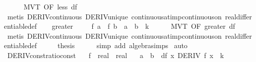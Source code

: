 \begin{isabellebody}
\ \ \ \ \isamarkupfalse%
\ MVT\ {\isacharbrackleft}{\kern0pt}OF\ less{\isacharbrackright}{\kern0pt}\ df\isanewline
\ \ \ \ \isamarkupfalse%
\ {\isacharparenleft}{\kern0pt}metis\ DERIV{\isacharunderscore}{\kern0pt}continuous\ DERIV{\isacharunderscore}{\kern0pt}unique\ continuous{\isacharunderscore}{\kern0pt}at{\isacharunderscore}{\kern0pt}imp{\isacharunderscore}{\kern0pt}continuous{\isacharunderscore}{\kern0pt}on\ real{\isacharunderscore}{\kern0pt}differentiable{\isacharunderscore}{\kern0pt}def{\isacharparenright}{\kern0pt}\isanewline
{}\isamarkupfalse%
\isanewline
\ \ \isamarkupfalse%
\ greater\isanewline
\ \ \isamarkupfalse%
\ \ {\isachardoublequoteopen}f\ a\ {\isacharminus}{\kern0pt}\ f\ b\ {\isacharequal}{\kern0pt}\ {\isacharparenleft}{\kern0pt}a\ {\isacharminus}{\kern0pt}\ b{\isacharparenright}{\kern0pt}\ {\isacharasterisk}{\kern0pt}\ k{\isachardoublequoteclose}\isanewline
\ \ \ \ \isamarkupfalse%
\ MVT\ {\isacharbrackleft}{\kern0pt}OF\ greater{\isacharbrackright}{\kern0pt}\ df\isanewline
\ \ \ \ \isamarkupfalse%
\ {\isacharparenleft}{\kern0pt}metis\ DERIV{\isacharunderscore}{\kern0pt}continuous\ DERIV{\isacharunderscore}{\kern0pt}unique\ continuous{\isacharunderscore}{\kern0pt}at{\isacharunderscore}{\kern0pt}imp{\isacharunderscore}{\kern0pt}continuous{\isacharunderscore}{\kern0pt}on\ real{\isacharunderscore}{\kern0pt}differentiable{\isacharunderscore}{\kern0pt}def{\isacharparenright}{\kern0pt}\isanewline
\ \ \isamarkupfalse%
\ \isamarkupfalse%
\ {\isacharquery}{\kern0pt}thesis\isanewline
\ \ \ \ \isamarkupfalse%
\ {\isacharparenleft}{\kern0pt}simp\ add{\isacharcolon}{\kern0pt}\ algebra{\isacharunderscore}{\kern0pt}simps{\isacharparenright}{\kern0pt}\isanewline
{}\isamarkupfalse%
\ auto%
\endisatagproof
{\isafoldproof}%
%
\isadelimproof
\isanewline
%
\endisadelimproof
\isanewline
{}\isamarkupfalse%
\ DERIV{\isacharunderscore}{\kern0pt}const{\isacharunderscore}{\kern0pt}ratio{\isacharunderscore}{\kern0pt}const{}{\isacharcolon}{\kern0pt}\isanewline
\ \ \ f\ {\isacharcolon}{\kern0pt}{\isacharcolon}{\kern0pt}\ {\isachardoublequoteopen}real\ {\isasymRightarrow}\ real{\isachardoublequoteclose}\isanewline
\ \ \ {\isachardoublequoteopen}a\ {\isasymnoteq}\ b{\isachardoublequoteclose}\ \ df{\isacharcolon}{\kern0pt}\ {\isachardoublequoteopen}{\isasymAnd}x{\isachardot}{\kern0pt}\ DERIV\ f\ x\ {\isacharcolon}{\kern0pt}{\isachargreater}{\kern0pt}\ k{\isachardoublequoteclose}\isanewline

\end{isabellebody}
